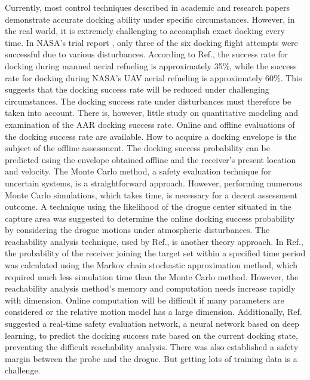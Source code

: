 Currently, most control techniques described in academic and research
papers demonstrate accurate docking ability under specific circumstances.
However, in the real world, it is extremely challenging to accomplish
exact docking every time. In NASA's trial report \cite{Dibley-2007-2},
only three of the six docking flight attempts were successful due
to various disturbances. According to Ref.\cite{wang2017approach},
the success rate for docking during manned aerial refueling is approximately
35\%, while the success rate for docking during NASA's UAV aerial
refueling is approximately 60\%. This suggests that the docking success
rate will be reduced under challenging circumstances. The docking
success rate under disturbances must therefore be taken into account.
There is, however, little study on quantitative modeling and examination
of the AAR docking success rate. Online and offline evaluations of
the docking success rate are available. How to acquire a docking envelope
is the subject of the offline assessment. The docking success probability
can be predicted using the envelope obtained offline and the receiver's
present location and velocity. The Monte Carlo method, a safety evaluation
technique for uncertain systems, is a straightforward approach. However,
performing numerous Monte Carlo simulations, which takes time, is
necessary for a decent assessment outcome. A technique using the likelihood
of the drogue center situated in the capture area was suggested to
determine the online docking success probability by considering the
drogue motions under atmospheric disturbances\cite{wang2017approach}.
The reachability analysis technique, used by Ref.\cite{liu2021stochastic},
is another theory approach. In Ref.\cite{liu2021stochastic}, the
probability of the receiver joining the target set within a specified
time period was calculated using the Markov chain stochastic approximation
method, which required much less simulation time than the Monte Carlo
method. However, the reachability analysis method's memory and computation
needs increase rapidly with dimension. Online computation will be
difficult if many parameters are considered or the relative motion
model has a large dimension. Additionally, Ref.\cite{liu2020docking}
suggested a real-time safety evaluation network, a neural network
based on deep learning, to predict the docking success rate based
on the current docking state, preventing the difficult reachability
analysis. There was also established a safety margin between the probe
and the drogue. But getting lots of training data is a challenge. 

